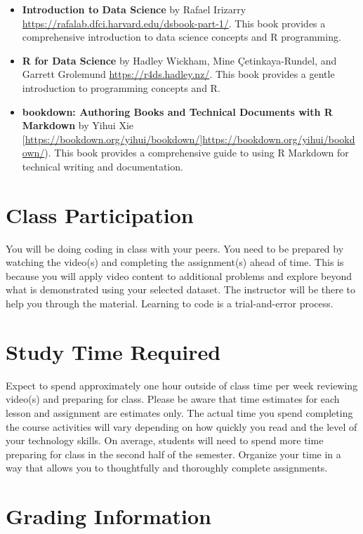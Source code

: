\documentclass[
  12pt,
]{scrreprt}
\begin{document}
\begin{itemize}
\item
  \textbf{Introduction to Data Science} by Rafael Irizarry
  \url{https://rafalab.dfci.harvard.edu/dsbook-part-1/}. This book
  provides a comprehensive introduction to data science concepts and R
  programming.
\item
  \textbf{R for Data Science} by Hadley Wickham, Mine Çetinkaya-Rundel,
  and Garrett Grolemund \url{https://r4ds.hadley.nz/}. This book
  provides a gentle introduction to programming concepts and R.
\item
  \textbf{bookdown: Authoring Books and Technical Documents with R
  Markdown} by Yihui Xie
  {[}\url{https://bookdown.org/yihui/bookdown/}{]}\url{https://bookdown.org/yihui/bookdown/}).
  This book provides a comprehensive guide to using R Markdown for
  technical writing and documentation.
\end{itemize}

\section{Class Participation}\label{class-participation}

You will be doing coding in class with your peers. You need to be
prepared by watching the video(s) and completing the assignment(s) ahead
of time. This is because you will apply video content to additional
problems and explore beyond what is demonstrated using your selected
dataset. The instructor will be there to help you through the material.
Learning to code is a trial-and-error process.

\section{Study Time Required}\label{study-time-required}

Expect to spend approximately one hour outside of class time per week
reviewing video(s) and preparing for class. Please be aware that time
estimates for each lesson and assignment are estimates only. The actual
time you spend completing the course activities will vary depending on
how quickly you read and the level of your technology skills. On
average, students will need to spend more time preparing for class in
the second half of the semester. Organize your time in a way that allows
you to thoughtfully and thoroughly complete assignments.

\section{Grading Information}\label{grading-information}
\end{document}
